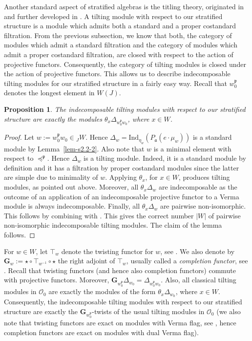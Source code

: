 \documentclass[a4paper]{amsart}
\newtheorem{proposition}[theorem]{Proposition}
\begin{document}
Another standard aspect of stratified algebras is the titling
theory, originated in \cite{Ri} and further developed
in \cite{AHLU,Fr,FM}. A tilting module with respect to our
stratified structure is a module which admits both a 
standard and a proper {costandard} filtration. From the previous subsection,
we know that both, the category of modules which admit a standard
filtration and the category of modules which admit a proper
{costandard} filtration, are closed with respect to the action of 
projective functors. Consequently, the category of tilting modules
is closed under the action of projective functors. This 
allows us to describe indecomposable tilting modules for our
stratified structure in a fairly easy way.
Recall that $w_0^\mathfrak{p}$ denotes the longest element
in $W(J)$.

\begin{proposition}\label{prop-tilting1}
The indecomposable tilting modules with respect to our
stratified structure are exactly the modules 
$\theta_x\Delta_{w_0^\mathfrak{p}w_0}$,
where $x\in W$.
\end{proposition}

\begin{proof}
Let $w:=w_0^\mathfrak{p}w_0\in {}_JW$. Hence
$\Delta_{w}=\mathrm{Ind}_{\eta_w}(P_\mathfrak{a}(e\cdot \mu_w))$
is a standard module by Lemma~\ref{lem-s2.2-2}.
Also note that  $w$ is a minimal element with respect to 
$\preceq^\mathfrak{p}$. Hence $\Delta_{w}$ is a tilting module.
Indeed, it is a standard module by definition and it has
a filtration by proper costandard modules since the latter are simple
due to minimality of $w$.
Applying $\theta_x$, for $x\in W$, produces tilting modules,
as pointed out above. Moreover, all $\theta_x\Delta_w$
are indecomposable as the outcome of an application of an indecomposable
projective functor to a Verma module is always indecomposable.
Finally, all $\theta_x\Delta_w$ are pairwise non-isomorphic.
This follows by combining \cite[Corollary~6.4]{Jo} with 
\cite[Proposition~7.2]{KMM2}.
This gives the correct number $|W|$ of pairwise non-isomorphic
indecomposable tilting modules.
The claim of the lemma follows.
\end{proof}

For $w\in W$, let $\top_w$ denote the twisting functor for $w$,
see \cite{AS}. We also denote by 
$\mathbf{G}_w:=\star\circ\top_{w^{-1}}\circ\star$
the right adjoint of $\top_w$, usually called a {\em completion functor},
see \cite{MS2}. Recall that twisting functors
(and hence also completion functors) commute with projective 
functors. Moreover, 
$\mathbf{G}_{w_0^\mathfrak{p}}\Delta_{w_0}=\Delta_{w_0^\mathfrak{p}w_0}$.
Also, all classical tilting modules in $\mathcal{O}_0$ are
exactly the modules of the form $\theta_x\Delta_{w_0}$,
where $x\in W$. Consequently, the indecomposable tilting modules 
with respect to our stratified structure are exactly the 
$\mathbf{G}_{w_0^\mathfrak{p}}$-twists of the usual tilting modules
in $\mathcal{O}_0$ (we also note that twisting functors are
exact on modules with Verma flag, see \cite{AS}, hence completion
functors are exact on modules with dual Verma flag).
\end{document}
